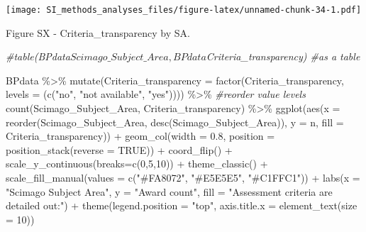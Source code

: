 \documentclass[
]{article}
\newenvironment{Shaded}{\begin{snugshade}}{\end{snugshade}}
\newcommand{\AttributeTok}[1]{\textcolor[rgb]{0.77,0.63,0.00}{#1}}
\newcommand{\CommentTok}[1]{\textcolor[rgb]{0.56,0.35,0.01}{\textit{#1}}}
\newcommand{\ConstantTok}[1]{\textcolor[rgb]{0.00,0.00,0.00}{#1}}
\newcommand{\DecValTok}[1]{\textcolor[rgb]{0.00,0.00,0.81}{#1}}
\newcommand{\FloatTok}[1]{\textcolor[rgb]{0.00,0.00,0.81}{#1}}
\newcommand{\FunctionTok}[1]{\textcolor[rgb]{0.00,0.00,0.00}{#1}}
\newcommand{\NormalTok}[1]{#1}
\newcommand{\SpecialCharTok}[1]{\textcolor[rgb]{0.00,0.00,0.00}{#1}}
\newcommand{\StringTok}[1]{\textcolor[rgb]{0.31,0.60,0.02}{#1}}
\begin{document}
\texttt{[image: SI\_methods\_analyses\_files/figure-latex/unnamed-chunk-34-1.pdf]}

Figure SX - Criteria\_transparency by SA.

\begin{Shaded}
\begin{Highlighting}[]
\CommentTok{\#table(BPdata$Scimago\_Subject\_Area, BPdata$Criteria\_transparency) \#as a table}

\NormalTok{BPdata }\SpecialCharTok{\%\textgreater{}\%} 
    \FunctionTok{mutate}\NormalTok{(}\AttributeTok{Criteria\_transparency =} \FunctionTok{factor}\NormalTok{(Criteria\_transparency, }\AttributeTok{levels =}\NormalTok{ (}\FunctionTok{c}\NormalTok{(}\StringTok{"no"}\NormalTok{, }\StringTok{"not available"}\NormalTok{, }\StringTok{"yes"}\NormalTok{)))) }\SpecialCharTok{\%\textgreater{}\%} \CommentTok{\#reorder value levels}
    \FunctionTok{count}\NormalTok{(Scimago\_Subject\_Area, Criteria\_transparency) }\SpecialCharTok{\%\textgreater{}\%}
    \FunctionTok{ggplot}\NormalTok{(}\FunctionTok{aes}\NormalTok{(}\AttributeTok{x =} \FunctionTok{reorder}\NormalTok{(Scimago\_Subject\_Area, }\FunctionTok{desc}\NormalTok{(Scimago\_Subject\_Area)), }\AttributeTok{y =}\NormalTok{ n, }\AttributeTok{fill =}\NormalTok{ Criteria\_transparency)) }\SpecialCharTok{+} 
    \FunctionTok{geom\_col}\NormalTok{(}\AttributeTok{width =} \FloatTok{0.8}\NormalTok{, }\AttributeTok{position =} \FunctionTok{position\_stack}\NormalTok{(}\AttributeTok{reverse =} \ConstantTok{TRUE}\NormalTok{)) }\SpecialCharTok{+}
    \FunctionTok{coord\_flip}\NormalTok{() }\SpecialCharTok{+}
    \FunctionTok{scale\_y\_continuous}\NormalTok{(}\AttributeTok{breaks=}\FunctionTok{c}\NormalTok{(}\DecValTok{0}\NormalTok{,}\DecValTok{5}\NormalTok{,}\DecValTok{10}\NormalTok{)) }\SpecialCharTok{+}
    \FunctionTok{theme\_classic}\NormalTok{() }\SpecialCharTok{+} 
    \FunctionTok{scale\_fill\_manual}\NormalTok{(}\AttributeTok{values =} \FunctionTok{c}\NormalTok{(}\StringTok{"\#FA8072"}\NormalTok{, }\StringTok{"\#E5E5E5"}\NormalTok{, }\StringTok{"\#C1FFC1"}\NormalTok{)) }\SpecialCharTok{+}
    \FunctionTok{labs}\NormalTok{(}\AttributeTok{x =} \StringTok{"Scimago Subject Area"}\NormalTok{, }\AttributeTok{y =} \StringTok{"Award count"}\NormalTok{, }\AttributeTok{fill =} \StringTok{"Assessment criteria are detailed out:"}\NormalTok{) }\SpecialCharTok{+} 
    \FunctionTok{theme}\NormalTok{(}\AttributeTok{legend.position =} \StringTok{"top"}\NormalTok{, }\AttributeTok{axis.title.x =} \FunctionTok{element\_text}\NormalTok{(}\AttributeTok{size =} \DecValTok{10}\NormalTok{))}
\end{Highlighting}
\end{Shaded}
\end{document}
